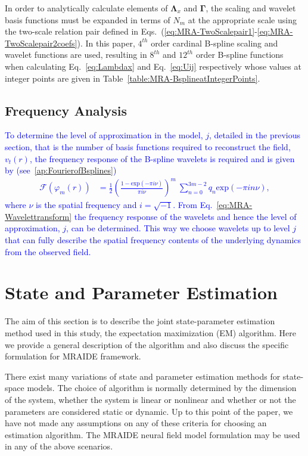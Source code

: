 \documentclass[review,authoryear,3p]{elsarticle}
\newcommand{\parham}[1]{\textcolor{blue}{#1}}
\begin{document}
In order to analytically calculate elements of $\boldsymbol\Lambda_{x}$ and $\boldsymbol\Gamma$, the scaling and wavelet basis functions must be expanded in terms of $N_m$ at the appropriate scale using the two-scale relation pair defined in Eqs.~(\eqref{eq:MRA-TwoScalepair1}-\eqref{eq:MRA-TwoScalepair2coefs}). 
In this paper, $4^{th}$ order cardinal B-spline scaling and wavelet functions are used, resulting in  $8^{th}$ and $12^{th}$ order B-spline functions when calculating Eq.~\eqref{eq:Lambdax} and Eq.~\eqref{eq:Uij} respectively  whose values at integer points are given in Table~\ref{table:MRA-BsplineatIntegerPoints}.
\subsection{Frequency Analysis}\label{sec:freq_anal}
\parham{To determine the level of approximation in the model, $j$, detailed in the previous section, that is the number of basis functions required to reconstruct the field, $v_t(r)$, the frequency response of the B-spline wavelets is required and is given by (see~\ref{ap:FourierofBsplines}) 
\begin{align}      
	  \mathcal{F}(\varphi_{m}\left(r\right)) &=\frac{1}{2}\left(\frac{1-\mathrm{exp}(-\pi i \nu)}{\pi i\nu}\right)^m~\sum_{n=0}^{3m-2}  q_n \mathrm{exp}(-\pi in\nu),\label{eq:MRA-Wavelettransform}
\end{align}
where $\nu$ is the spatial frequency and $i=\sqrt{-1}$. From Eq.~\eqref{eq:MRA-Wavelettransform} the frequency response of the wavelets and hence the level of approximation, $j$, can be determined. This way we choose wavelets up to level $j$ that can fully describe the spatial frequency contents of the underlying dynamics from the observed field.}
\section{State and Parameter Estimation}
The aim of this section is to describe the joint state-parameter estimation method used in this study, the expectation maximization (EM) algorithm. Here we provide a general description of the algorithm and also discuss the specific formulation for MRAIDE framework. 

There exist many variations of state and parameter estimation methods for state-space models. The choice of algorithm is normally determined by the dimension of the system, whether the system is linear or nonlinear and whether or not the parameters are considered static or dynamic. Up to this point of the paper, we have not made any assumptions on any of these criteria for choosing an estimation algorithm. The MRAIDE neural field model formulation may be used in any of the above scenarios. 
\end{document}
